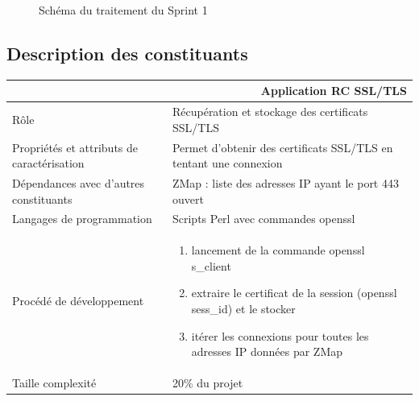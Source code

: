 \documentclass[a4paper,11pt,french]{article}
\begin{document}
\vspace*{1cm}
\begin{figure}[!htbp]
\begin{center}
\end{center}
\caption{Schéma du traitement du Sprint 1}
\end{figure}

\subsection{Description des constituants}

\begin{center}
	\vspace*{0.7cm}
	\begin{tabularx}{16cm}{|l|X|}
	\hline
	\multicolumn{2}{|r|}{\textbf{Application RC SSL/TLS}}\\
	\hline
	R\^ole & Récupération et stockage des certificats SSL/TLS \\
	\hline
	Propriétés et attributs de caractérisation & Permet d'obtenir des certificats SSL/TLS en tentant une connexion  \\
	\hline
	Dépendances avec d'autres constituants & ZMap : liste des adresses IP ayant le port 443 ouvert\\
	\hline
	Langages de programmation & Scripts Perl avec commandes openssl \\
	\hline
	Procédé de développement & \begin{enumerate} \item lancement de la commande openssl s\_client \item extraire le certificat de la session (openssl sess\_id) et le stocker \item itérer les connexions pour toutes les adresses IP données par ZMap \end{enumerate} \\
	\hline
	Taille complexité & 20\% du projet\\
	\hline
	\end{tabularx}
\end{center}
\end{document}
